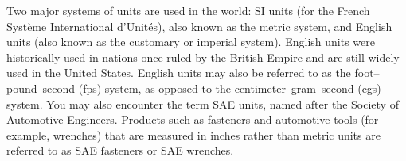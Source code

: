 \documentclass{report}
\begin{document}
    \pagebreak 
    \bigbreak \noindent 
    Two major systems of units are used in the world: SI units (for the French Système International d’Unités), also known as the metric system, and English units (also known as the customary or imperial system). English units were historically used in nations once ruled by the British Empire and are still widely used in the United States. English units may also be referred to as the foot–pound–second (fps) system, as opposed to the centimeter–gram–second (cgs) system. You may also encounter the term SAE units, named after the Society of Automotive Engineers. Products such as fasteners and automotive tools (for example, wrenches) that are measured in inches rather than metric units are referred to as SAE fasteners or SAE wrenches.

    \bigbreak \noindent 
\end{document}
